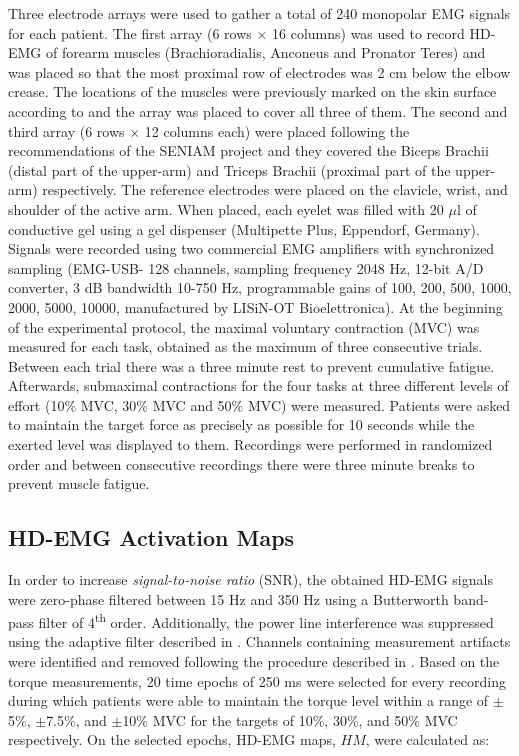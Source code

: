 Three electrode arrays were used to gather a total of 240 monopolar EMG signals for each patient. The first array (6 rows $\times$ 16 columns) was used to record HD-EMG of forearm muscles (Brachioradialis, Anconeus and Pronator Teres) and was placed so that the most proximal row of electrodes was 2 cm below the elbow crease. The locations of the muscles were previously marked on the skin surface according to \citep{Kendall1993} and the array was placed to cover all three of them. The second and third array (6 rows $\times$ 12 columns each) were placed following the recommendations of the SENIAM project \citep{Hermens1999} and they covered the Biceps Brachii (distal part of the upper-arm) and Triceps Brachii (proximal part of the upper-arm) respectively. The reference electrodes were placed on the clavicle, wrist, and shoulder of the active arm. When placed, each eyelet was filled with 20 $\mu$l of conductive gel using a gel dispenser (Multipette Plus, Eppendorf, Germany).
Signals were recorded using two commercial EMG amplifiers with synchronized sampling (EMG-USB- 128 channels, sampling frequency 2048 Hz, 12-bit A/D converter, 3 dB bandwidth 10-750 Hz, programmable gains of 100, 200, 500, 1000, 2000, 5000, 10000, manufactured by LISiN-OT Bioelettronica).
At the beginning of the experimental protocol, the maximal voluntary contraction (MVC) was measured for each task, obtained as the maximum of three consecutive trials. Between each trial there was a three minute rest to prevent cumulative fatigue.
Afterwards, submaximal contractions for the four tasks at three different levels of effort (10\% MVC, 30\% MVC and 50\% MVC) were measured. Patients were asked to maintain the target force as precisely as possible for 10 seconds while the exerted level was displayed to them. Recordings were performed in randomized order and between consecutive recordings there were three minute breaks to prevent muscle fatigue.


\subsection*{HD-EMG Activation Maps}

In order to increase \emph{signal-to-noise ratio} (SNR), the obtained HD-EMG signals were zero-phase filtered between 15 Hz and 350 Hz using a Butterworth band-pass filter of 4\textsuperscript{th} order. Additionally, the power line interference was suppressed using the adaptive filter described in \citep{Mananas2001}. Channels containing measurement artifacts were identified and removed following the procedure described in \citep{Rojas-Martinez2012}.
Based on the torque measurements, 20 time epochs of 250 ms were selected for every recording during which patients were able to maintain the torque level within a range of $\pm$5\%, $\pm$7.5\%, and $\pm$10\% MVC for the targets of 10\%, 30\%, and 50\% MVC respectively. On the selected epochs, HD-EMG maps, $HM$, were calculated as:

